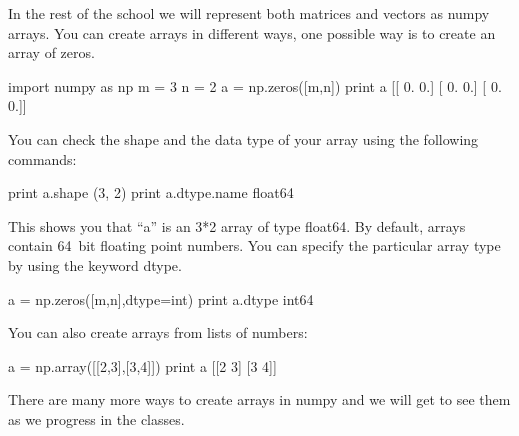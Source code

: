 \begin{exercise}
In the rest of the school we will represent both matrices and vectors as numpy arrays. You can create arrays in different ways, one possible way is to create an array of zeros.
\begin{python}
import numpy as np
m = 3
n = 2
a = np.zeros([m,n])
print a 
[[ 0.  0.]
 [ 0.  0.]
 [ 0.  0.]]
\end{python}

You can check the shape and the data type of your array using the following commands:
\begin{python}
print a.shape
(3, 2)
print a.dtype.name
float64
\end{python}
This shows you that ``a'' is an 3*2 array of type float64. By default, arrays contain 64~bit\footnotemark{} floating point numbers. You can specify the particular array type by using the keyword dtype.

\begin{python}
a = np.zeros([m,n],dtype=int)
print a.dtype
int64
\end{python}

\smallskip

You can also create arrays from lists of numbers:
\begin{python}
a = np.array([[2,3],[3,4]])
print a
[[2 3]
 [3 4]]
\end{python}

There are many more ways to create arrays in numpy and we will get to see them as we progress in the classes.

\end{exercise}

